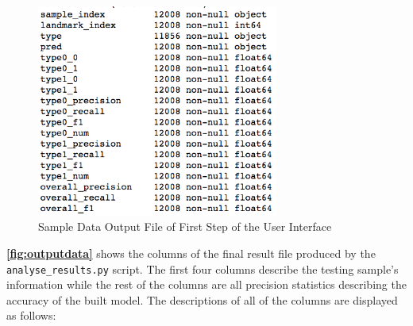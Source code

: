 \documentclass[10pt,letterpaper]{article}
\begin{document}
\begin{figure}[h]

{\centering \includegraphics[width=300px]{figures/Figure5} 

}

\caption{\label{fig:outputdata} Sample Data Output File of First Step of the User Interface}\label{fig:unnamed-chunk-8}
\end{figure}

\textbf{\autoref{fig:outputdata}} shows the columns of the final result
file produced by the \texttt{analyse\_results.py} script. The first four
columns describe the testing sample's information while the rest of the
columns are all precision statistics describing the accuracy of the
built model. The descriptions of all of the columns are displayed as
follows:
\end{document}

